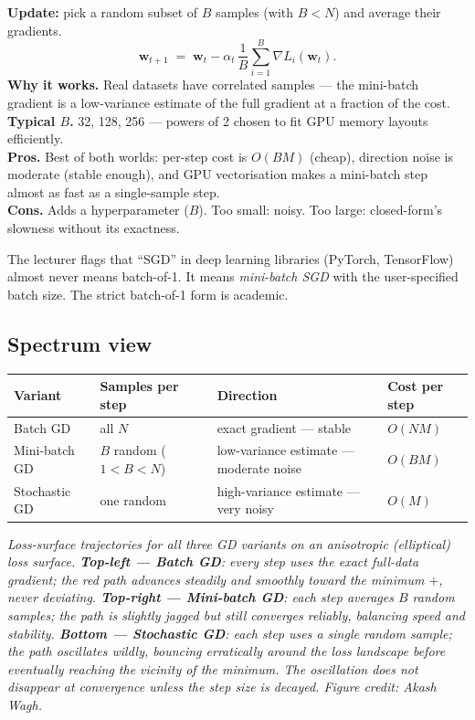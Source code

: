 \documentclass[11pt, a4paper]{article}
\newcommand{\thead}[1]{\textbf{#1}}
\begin{document}
\textbf{Update:} pick a random subset of $B$ samples (with $B<N$) and average their gradients.
\[
\mathbf{w}_{t+1} \;=\; \mathbf{w}_t - \alpha_t\,\frac{1}{B}\sum_{i=1}^B \nabla L_i(\mathbf{w}_t).
\]
\textbf{Why it works.} Real datasets have correlated samples — the mini-batch gradient is a low-variance estimate of the full gradient at a fraction of the cost.\\
\textbf{Typical $B$.} 32, 128, 256 — powers of 2 chosen to fit GPU memory layouts efficiently.\\
\textbf{Pros.} Best of both worlds: per-step cost is $O(BM)$ (cheap), direction noise is moderate (stable enough), and GPU vectorisation makes a mini-batch step almost as fast as a single-sample step.\\
\textbf{Cons.} Adds a hyperparameter ($B$). Too small: noisy. Too large: closed-form's slowness without its exactness.

\begin{notebox}
The lecturer flags that ``SGD'' in deep learning libraries (PyTorch, TensorFlow) almost never means batch-of-1. It means \emph{mini-batch SGD} with the user-specified batch size. The strict batch-of-1 form is academic.
\end{notebox}

\subsection{Spectrum view}

\begin{tabularx}{\linewidth}{@{}lXXX@{}}
\toprule
\thead{Variant} & \thead{Samples per step} & \thead{Direction} & \thead{Cost per step} \\
\midrule
Batch GD       & all $N$ & exact gradient — stable & $O(NM)$ \\
Mini-batch GD  & $B$ random ($1<B<N$) & low-variance estimate — moderate noise & $O(BM)$ \\
Stochastic GD  & one random & high-variance estimate — very noisy & $O(M)$ \\
\bottomrule
\end{tabularx}

\begin{center}

\footnotesize\textit{Loss-surface trajectories for all three GD variants on an anisotropic (elliptical) loss surface. \textbf{Top-left --- Batch GD}: every step uses the exact full-data gradient; the red path advances steadily and smoothly toward the minimum $+$, never deviating. \textbf{Top-right --- Mini-batch GD}: each step averages $B$ random samples; the path is slightly jagged but still converges reliably, balancing speed and stability. \textbf{Bottom --- Stochastic GD}: each step uses a single random sample; the path oscillates wildly, bouncing erratically around the loss landscape before eventually reaching the vicinity of the minimum. The oscillation does not disappear at convergence unless the step size is decayed. Figure credit: Akash Wagh.}
\end{center}
\end{document}
